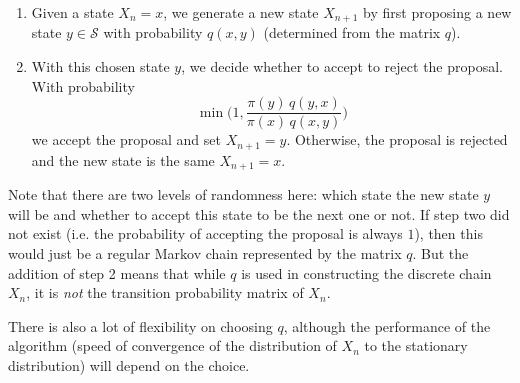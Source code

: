 \documentclass{article}
\begin{document}
      \begin{enumerate}
        \item Given a state $X_n = x$, we generate a new state $X_{n+1}$ by first proposing a new state $y \in \mathcal{S}$ with probability $q(x, y)$ (determined from the matrix $q$). 
        \item With this chosen state $y$, we decide whether to accept to reject the proposal. With probability 
        \begin{equation}
          \min \bigg( 1, \frac{\pi(y) \,  q(y, x)}{\pi(x) \, q(x, y)} \bigg)
        \end{equation}
        we accept the proposal and set $X_{n+1} = y$. Otherwise, the proposal is rejected and the new state is the same $X_{n+1} = x$. 
      \end{enumerate}

      Note that there are two levels of randomness here: which state the new state $y$ will be and whether to accept this state to be the next one or not. If step two did not exist (i.e. the probability of accepting the proposal is always $1$), then this would just be a regular Markov chain represented by the matrix $q$. But the addition of step 2 means that while $q$ is used in constructing the discrete chain $X_n$, it is \textit{not} the transition probability matrix of $X_n$. 

      There is also a lot of flexibility on choosing $q$, although the performance of the algorithm (speed of convergence of the distribution of $X_n$ to the stationary distribution) will depend on the choice.
\end{document}
